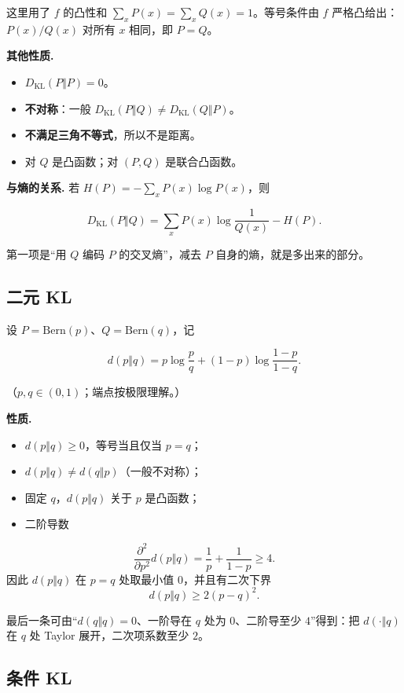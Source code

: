 这里用了 $f$ 的凸性和 $\sum_xP(x)=\sum_xQ(x)=1$。等号条件由 $f$ 严格凸给出：$P(x)/Q(x)$ 对所有 $x$ 相同，即 $P=Q$。

\textbf{其他性质.}

\begin{itemize}
\item $D_{\mathrm{KL}}(P\Vert P)=0$。
\item \textbf{不对称}：一般 $D_{\mathrm{KL}}(P\Vert Q)\ne D_{\mathrm{KL}}(Q\Vert P)$。
\item \textbf{不满足三角不等式}，所以不是距离。
\item 对 $Q$ 是凸函数；对 $(P,Q)$ 是联合凸函数。
\end{itemize}


\textbf{与熵的关系.} 若 $H(P)=-\sum_xP(x)\log P(x)$，则

\[
D_{\mathrm{KL}}(P\Vert Q)
=\sum_xP(x)\log\frac1{Q(x)}-H(P).
\]

第一项是“用 $Q$ 编码 $P$ 的交叉熵”，减去 $P$ 自身的熵，就是多出来的部分。

\subsection{二元 KL}


设 $P=\mathrm{Bern}(p)$、$Q=\mathrm{Bern}(q)$，记

\[
d(p\Vert q)
=p\log\frac pq+(1-p)\log\frac{1-p}{1-q}.
\]

（$p,q\in(0,1)$；端点按极限理解。）

\textbf{性质.}

\begin{itemize}
\item $d(p\Vert q)\ge0$，等号当且仅当 $p=q$；
\item $d(p\Vert q)\ne d(q\Vert p)$（一般不对称）；
\item 固定 $q$，$d(p\Vert q)$ 关于 $p$ 是凸函数；
\item 二阶导数
\end{itemize}

\[
  \frac{\partial^2}{\partial p^2}d(p\Vert q)
  =\frac1p+\frac1{1-p}\ge4.
\]
  因此 $d(p\Vert q)$ 在 $p=q$ 处取最小值 $0$，并且有二次下界
\[
  d(p\Vert q)\ge2(p-q)^2.
\]

最后一条可由“$d(q\Vert q)=0$、一阶导在 $q$ 处为 $0$、二阶导至少 $4$”得到：把 $d(\cdot\Vert q)$ 在 $q$ 处 Taylor 展开，二次项系数至少 $2$。

\subsection{条件 KL}


